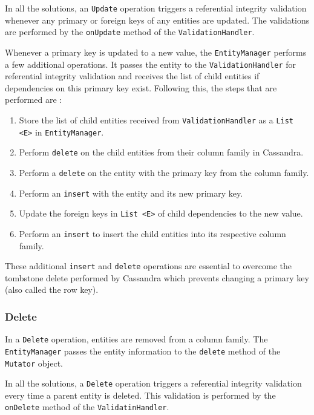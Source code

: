 		In all the solutions,  an \texttt{Update} operation triggers a referential
		integrity validation whenever any primary or foreign keys of any entities are updated.
		The validations are performed by the \texttt{onUpdate} method of the
		\texttt{ValidationHandler}.
		
		Whenever a primary key is updated to a new value, the
		\texttt{EntityManager} performs a few additional operations. It passes the entity to the
		\texttt{ValidationHandler} for referential integrity validation and receives
		the list of child entities if dependencies on this primary key exist.
		Following this, the steps that are performed are :
		\begin{enumerate}
		  \item Store the list of child entities received from
		  \texttt{ValidationHandler} as a \texttt{List <E>} in
		  \texttt{EntityManager}.
		  \item Perform \texttt{delete} on the child entities from their column family
		  in Cassandra.
		  \item Perform a \texttt{delete} on the entity with the primary key from the
		  column family.
		  \item Perform an \texttt{insert} with the entity and its new primary key.
		  \item Update the foreign keys in \texttt{List <E>} of child dependencies to
		  the new value.
		  \item Perform an \texttt{insert} to insert the child entities into its
		  respective column family.
		\end{enumerate}
		
		These additional \texttt{insert} and \texttt{delete} operations are essential
		to overcome the tombstone delete performed by Cassandra which prevents
		changing a primary key (also called the row key).
		
		\subsubsection{Delete}\label{ss:delete}
		In a  \texttt{Delete} operation, entities are removed from a column
		family. The \texttt{EntityManager} passes the entity
		information to the \texttt{delete} method of the \texttt{Mutator} object.
		
		In all the solutions,  a \texttt{Delete} operation triggers a referential
		integrity validation every time a parent entity is deleted. This validation is performed by
 		the \texttt{onDelete} method of the \texttt{ValidatinHandler}.
 		
